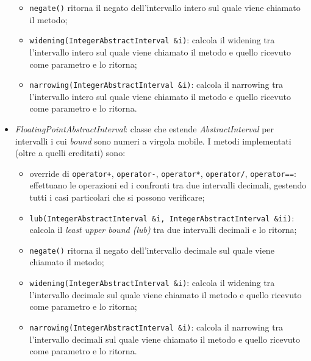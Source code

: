 \documentclass[a4paper, 10pt]{report}
\begin{document}
\begin{itemize}
\begin{itemize}
		\item \verb|negate()| ritorna il negato dell'intervallo intero sul quale viene chiamato il metodo;
		\item \verb|widening(IntegerAbstractInterval &i)|: calcola il widening tra l'intervallo intero sul quale viene chiamato il metodo e quello ricevuto come parametro e lo ritorna;
		\item \verb|narrowing(IntegerAbstractInterval &i)|: calcola il narrowing tra l'intervallo intero sul quale viene chiamato il metodo e quello ricevuto come parametro e lo ritorna.
	\end{itemize}
	\item \textit{FloatingPointAbstractInterval}: classe che estende \textit{AbstractInterval} per intervalli i cui \textit{bound} sono numeri a virgola mobile. I metodi implementati (oltre a quelli ereditati) sono:
		\begin{itemize}
			\item override di \verb|operator+|, \verb|operator-|, \verb|operator*|, \verb|operator/|, \verb|operator==|: effettuano le operazioni ed i confronti tra due intervalli decimali, gestendo tutti i casi particolari che si possono verificare;
			\item \verb|lub(IntegerAbstractInterval &i, IntegerAbstractInterval &ii)|: calcola il \textit{least upper bound (lub)} tra due intervalli decimali e lo ritorna;
			\item \verb|negate()| ritorna il negato dell'intervallo decimale sul quale viene chiamato il metodo;
			\item \verb|widening(IntegerAbstractInterval &i)|: calcola il widening tra l'intervallo decimale sul quale viene chiamato il metodo e quello ricevuto come parametro e lo ritorna;
			\item \verb|narrowing(IntegerAbstractInterval &i)|: calcola il narrowing tra l'intervallo decimali sul quale viene chiamato il metodo e quello ricevuto come parametro e lo ritorna.
		\end{itemize}
	

\end{itemize}
\end{document}
